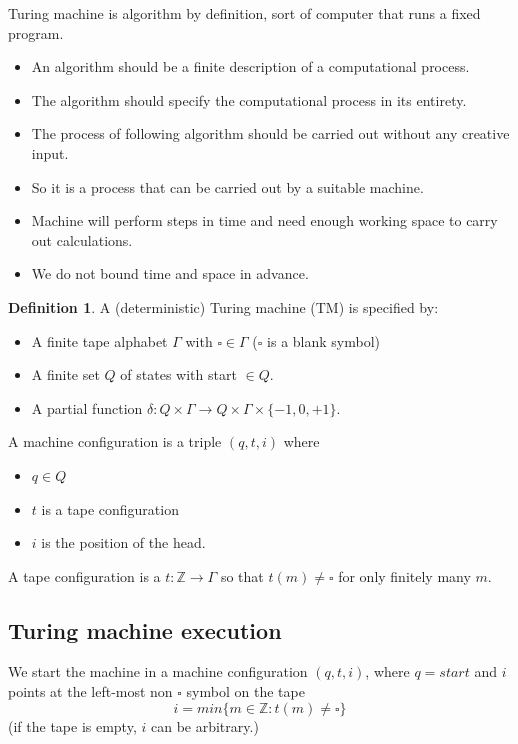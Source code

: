\documentclass[a4paper,12pt]{article}
\theoremstyle{definition}
\newtheorem{definition}[counter]{Definition}
\theoremstyle{remark}
\newcommand{\Z}{\mathbb{Z}}
\begin{document}
Turing machine is algorithm by definition, sort of computer that runs a fixed program.

\begin{itemize}
    \item An algorithm should be a finite description of a computational process.
    \item The algorithm should specify the computational process in its entirety.
    \item The process of following algorithm should be carried out without any creative input.
    \item So it is a process that can be carried out by a suitable machine.
    \item Machine will perform steps in time and need enough working space to carry out calculations.
    \item We do not bound time and space in advance.
\end{itemize}

\begin{definition}
    A (deterministic) Turing machine (TM) is specified by:
    \begin{itemize}
        \item A finite tape alphabet $\Gamma$ with $\square \in \Gamma$ ($\square$ is a blank symbol)
        \item A finite set $Q$ of states with start $\in Q$.
        \item A partial function $\delta: Q \times \Gamma \to Q \times \Gamma \times \{-1, 0, +1\}$.
    \end{itemize}
\end{definition}

A machine configuration is a triple $(q, t, i)$ where
\begin{itemize}
    \item $q \in Q$
    \item $t$ is a tape configuration
    \item $i$ is the position of the head.
\end{itemize}

A tape configuration is a $t: \Z \to \Gamma$ so that $t(m) \neq \square$ for only finitely many $m$.

\subsection{Turing machine execution}
We start the machine in a machine configuration $(q, t, i)$, where $q = start$ and $i$ points at the left-most non $\square$ symbol
on the tape
\begin{equation*}
    i = min\{m \in \Z: t(m) \neq \square\}
\end{equation*}
(if the tape is empty, $i$ can be arbitrary.)
\end{document}
